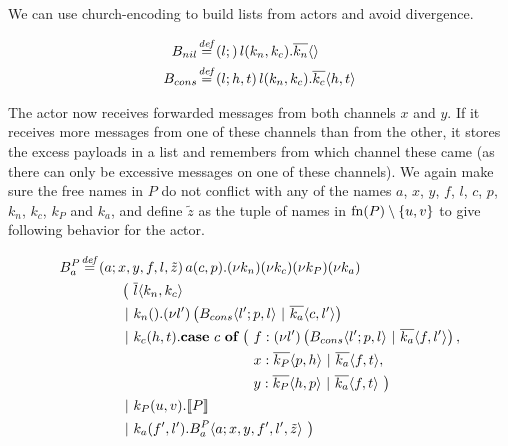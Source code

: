 We can use church-encoding to build lists from actors and avoid divergence.


\begin{align*}
  \adef*{B_{nil}}{l}{}{\arcv{l}{k_n,k_c} . \asnd{k_n}{}}
  \\
  \adef*{B_{cons}}{l}{h,t}{\arcv{l}{k_n,k_c} . \asnd{k_c}{h,t}}
\end{align*}

The actor now receives forwarded messages from both channels $x$ and $y$.
If it receives more messages from one of these channels than from the other,
it stores the excess payloads in a list and remembers from which channel
these came (as there can only be excessive messages on one of these channels).
We again make sure the free names in $P$ do not conflict with any of the names
$a$, $x$, $y$, $f$, $l$, $c$, $p$, $k_n$, $k_c$, $k_P$ and $k_a$,
and define $\tilde{z}$
as the tuple of names in $\operatorname{fn}(P) \setminus {\{u, v\}}$
to give following behavior for the actor.

\begin{align*}
  \adef*{B_a^P}{a}{x,y,f,l,\tilde{z}}{\arcv{a}{c,p} . \anew{k_n}{\anew{k_c}{\anew{k_P}{\anew{k_a}{
    \\
    &\hspace{1cm}
    \begin{aligned}[t]
      \big(\ &\asnd{l}{k_n,k_c}
      \\
      \apar  &\arcv{k_n}{} . \anew{l'}{\parens{\ains{B_{cons}}{l'}{p, l} \apar \asnd{k_a}{c, l'}}}
      \\
      \apar  &\arcv{k_c}{h,t} .
        \begin{aligned}[t]
          \acse*{c}{
          \ &\aalt{f}{\anew{l'}{\parens{\ains{B_{cons}}{l'}{p, l} \apar \asnd{k_a}{f, l'}}}}, \\
            &\aalt{x}{\asnd{k_P}{p,h} \apar \asnd{k_a}{f,t}}, \\
            &\aalt{y}{\asnd{k_P}{h,p} \apar \asnd{k_a}{f,t}}
          \ }
        \end{aligned}
      \\
      \apar  &\arcv{k_P}{u,v} . \encMJtoAP{P}
      \\
      \apar  &\arcv{k_a}{f',l'} . \ains{B_a^P}{a}{x, y, f', l',\tilde{z}}
      \ \big)
    \end{aligned}
  }}}}} \\
\end{align*}

